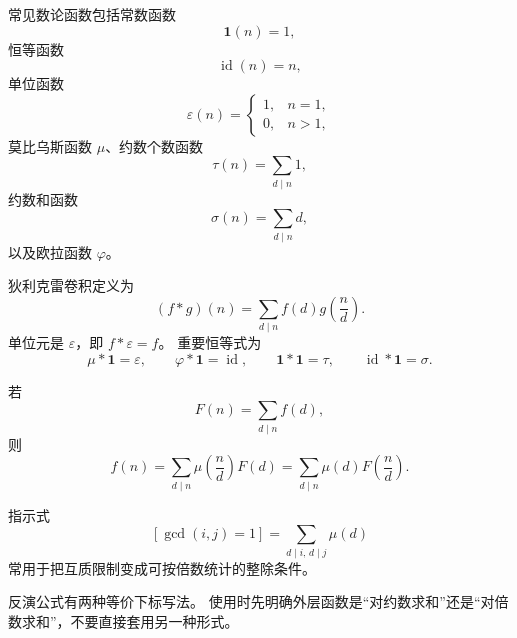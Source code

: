 常见数论函数包括常数函数
\[
  \mathbf 1(n)=1,
\]
恒等函数
\[
  \operatorname{id}(n)=n,
\]
单位函数
\[
  \varepsilon(n)=\begin{cases}1,&n=1,\\0,&n>1,\end{cases}
\]
莫比乌斯函数 $\mu$、约数个数函数
\[
  \tau(n)=\sum_{d\mid n}1,
\]
约数和函数
\[
  \sigma(n)=\sum_{d\mid n}d,
\]
以及欧拉函数 $\varphi$。

狄利克雷卷积定义为
\[
  (f*g)(n)=\sum_{d\mid n}f(d)g\!\left(\frac nd\right).
\]
单位元是 $\varepsilon$，即 $f*\varepsilon=f$。
重要恒等式为
\[
  \mu*\mathbf 1=\varepsilon,
  \qquad
  \varphi*\mathbf 1=\operatorname{id},
  \qquad
  \mathbf 1*\mathbf 1=\tau,
  \qquad
  \operatorname{id}*\mathbf 1=\sigma.
\]

\begin{icpcresult}[莫比乌斯反演]
  若
  \[
    F(n)=\sum_{d\mid n}f(d),
  \]
  则
  \[
    f(n)=\sum_{d\mid n}\mu\!\left(\frac nd\right)F(d)
        =\sum_{d\mid n}\mu(d)F\!\left(\frac nd\right).
  \]
\end{icpcresult}

指示式
\[
  [\gcd(i,j)=1]=\sum_{d\mid i,\,d\mid j}\mu(d)
\]
常用于把互质限制变成可按倍数统计的整除条件。

\begin{icpcwarning}[卷积方向]
  反演公式有两种等价下标写法。
  使用时先明确外层函数是“对约数求和”还是“对倍数求和”，不要直接套用另一种形式。
\end{icpcwarning}
